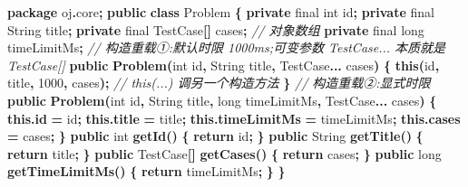 \documentclass[
  11pt,
]{ctexart}
\newenvironment{Shaded}{\begin{snugshade}}{\end{snugshade}}
\newcommand{\BuiltInTok}[1]{#1}
\newcommand{\CommentTok}[1]{\textcolor[rgb]{0.56,0.35,0.01}{\textit{#1}}}
\newcommand{\ControlFlowTok}[1]{\textcolor[rgb]{0.13,0.29,0.53}{\textbf{#1}}}
\newcommand{\DataTypeTok}[1]{\textcolor[rgb]{0.13,0.29,0.53}{#1}}
\newcommand{\DecValTok}[1]{\textcolor[rgb]{0.00,0.00,0.81}{#1}}
\newcommand{\FunctionTok}[1]{\textcolor[rgb]{0.13,0.29,0.53}{\textbf{#1}}}
\newcommand{\ImportTok}[1]{#1}
\newcommand{\KeywordTok}[1]{\textcolor[rgb]{0.13,0.29,0.53}{\textbf{#1}}}
\newcommand{\NormalTok}[1]{#1}
\newcommand{\OperatorTok}[1]{\textcolor[rgb]{0.81,0.36,0.00}{\textbf{#1}}}
\begin{document}
\begin{Shaded}
\begin{Highlighting}[]
\KeywordTok{package}\ImportTok{ oj}\OperatorTok{.}\ImportTok{core}\OperatorTok{;}
\KeywordTok{public} \KeywordTok{class}\NormalTok{ Problem }\OperatorTok{\{}
    \KeywordTok{private} \DataTypeTok{final} \DataTypeTok{int}\NormalTok{ id}\OperatorTok{;}
    \KeywordTok{private} \DataTypeTok{final} \BuiltInTok{String}\NormalTok{ title}\OperatorTok{;}
    \KeywordTok{private} \DataTypeTok{final}\NormalTok{ TestCase}\OperatorTok{[]}\NormalTok{ cases}\OperatorTok{;}        \CommentTok{// 对象数组}
    \KeywordTok{private} \DataTypeTok{final} \DataTypeTok{long}\NormalTok{ timeLimitMs}\OperatorTok{;}
    \CommentTok{// 构造重载①:默认时限 1000ms;可变参数 TestCase... 本质就是 TestCase[]}
    \KeywordTok{public} \FunctionTok{Problem}\OperatorTok{(}\DataTypeTok{int}\NormalTok{ id}\OperatorTok{,} \BuiltInTok{String}\NormalTok{ title}\OperatorTok{,}\NormalTok{ TestCase}\KeywordTok{...}\NormalTok{ cases}\OperatorTok{)} \OperatorTok{\{}
        \KeywordTok{this}\OperatorTok{(}\NormalTok{id}\OperatorTok{,}\NormalTok{ title}\OperatorTok{,} \DecValTok{1000}\OperatorTok{,}\NormalTok{ cases}\OperatorTok{);}      \CommentTok{// this(...) 调另一个构造方法}
    \OperatorTok{\}}
    \CommentTok{// 构造重载②:显式时限}
    \KeywordTok{public} \FunctionTok{Problem}\OperatorTok{(}\DataTypeTok{int}\NormalTok{ id}\OperatorTok{,} \BuiltInTok{String}\NormalTok{ title}\OperatorTok{,} \DataTypeTok{long}\NormalTok{ timeLimitMs}\OperatorTok{,}\NormalTok{ TestCase}\KeywordTok{...}\NormalTok{ cases}\OperatorTok{)} \OperatorTok{\{}
        \KeywordTok{this}\OperatorTok{.}\FunctionTok{id} \OperatorTok{=}\NormalTok{ id}\OperatorTok{;} \KeywordTok{this}\OperatorTok{.}\FunctionTok{title} \OperatorTok{=}\NormalTok{ title}\OperatorTok{;}
        \KeywordTok{this}\OperatorTok{.}\FunctionTok{timeLimitMs} \OperatorTok{=}\NormalTok{ timeLimitMs}\OperatorTok{;} \KeywordTok{this}\OperatorTok{.}\FunctionTok{cases} \OperatorTok{=}\NormalTok{ cases}\OperatorTok{;}
    \OperatorTok{\}}
    \KeywordTok{public} \DataTypeTok{int} \FunctionTok{getId}\OperatorTok{()}           \OperatorTok{\{} \ControlFlowTok{return}\NormalTok{ id}\OperatorTok{;} \OperatorTok{\}}
    \KeywordTok{public} \BuiltInTok{String} \FunctionTok{getTitle}\OperatorTok{()}     \OperatorTok{\{} \ControlFlowTok{return}\NormalTok{ title}\OperatorTok{;} \OperatorTok{\}}
    \KeywordTok{public}\NormalTok{ TestCase}\OperatorTok{[]} \FunctionTok{getCases}\OperatorTok{()} \OperatorTok{\{} \ControlFlowTok{return}\NormalTok{ cases}\OperatorTok{;} \OperatorTok{\}}
    \KeywordTok{public} \DataTypeTok{long} \FunctionTok{getTimeLimitMs}\OperatorTok{()} \OperatorTok{\{} \ControlFlowTok{return}\NormalTok{ timeLimitMs}\OperatorTok{;} \OperatorTok{\}}
\OperatorTok{\}}
\end{Highlighting}
\end{Shaded}
\end{document}
